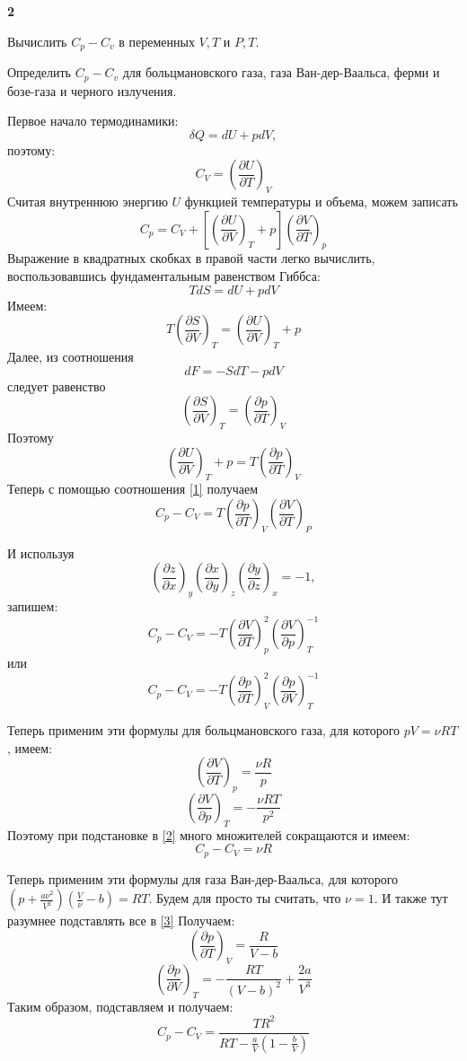 \documentclass[a4paper,12pt]{article} %
\begin{document}
\begin{task}\textbf{2}

Вычислить $ C_p-C_v$ в  переменных $ V, T $ и $ P, T$. 

Определить $ C_p-C_v$ для больцмановского газа,
газа Ван-дер-Ваальса, ферми и бозе-газа и черного излучения.

Первое начало термодинамики:
$$
\delta Q=d U+p d V,
$$
поэтому:
$$
C_{V}=\left(\frac{\partial U}{\partial T}\right)_{V}
$$
Считая внутреннюю энергию $U$ функцией температуры и объема, можем записать
\begin{equation}\label{1}
C_{p}=C_{V}+\left[\left(\frac{\partial U}{\partial V}\right)_{T}+p\right]\left(\frac{\partial V}{\partial T}\right)_{p}
\end{equation}
Выражение в квадратных скобках в правой части легко вычислить, воспользовавшись фундаментальным равенством Гиббса:
$$
T d S=d U+p d V
$$
Имеем:
$$
T\left(\frac{\partial S}{\partial V}\right)_{T}=\left(\frac{\partial U}{\partial V}\right)_{T}+p
$$
Далее, из соотношения
$$
d F=-S d T-p d V
$$
следует равенство
$$
\left(\frac{\partial S}{\partial V}\right)_{T}=\left(\frac{\partial p}{\partial T}\right)_{V}
$$
Поэтому
$$
\left(\frac{\partial U}{\partial V}\right)_{T}+p=T\left(\frac{\partial p}{\partial T}\right)_{V}
$$
Теперь с помощью соотношения \ref{1} получаем
$$
C_{p}-C_{V}=T\left(\frac{\partial p}{\partial T}\right)_{V}\left(\frac{\partial V}{\partial T}\right)_{P}
$$

И используя 
\[ \left(\frac{\partial z}{\partial x}\right)_{y}\left(\frac{\partial x}{\partial y}\right)_{z}\left(\frac{\partial y}{\partial z}\right)_{x}=-1, \]
запишем:
\begin{equation}\label{2}
C_{p}-C_{V}=
-T\left(\frac{\partial V}{\partial T}\right)_{p}^{2}\left(\frac{\partial V}{\partial p}\right)_{T}^{-1}
\end{equation}
или
\begin{equation}\label{3}
C_{p}-C_{V}=
-T\left(\frac{\partial p}{\partial T}\right)_{V}^{2}\left(\frac{\partial p}{\partial V}\right)_{T}^{-1}
\end{equation}


Теперь применим эти формулы для больцмановского газа, для которого $ pV=\nu RT $, имеем:
\[ \left(\frac{\partial V}{\partial T}\right)_{p}=\frac{\nu R}{p} \]
\[\left(\frac{\partial V}{\partial p}\right)_{T} =-\frac{\nu RT}{p^2} \]
Поэтому при подстановке в \ref{2} много множителей сокращаются и имеем:
\[ C_p-C_V=\nu R \]

Теперь применим эти формулы для газа Ван-дер-Ваальса, для которого $ \left(p+\frac{a\nu^2}{V^{2}}\right)\left(\frac{V}{\nu}-b\right)=R T$. 
Будем для просто ты считать, что $\nu=1$. 
И также тут разумнее подставлять все в \ref{3}
Получаем:
\[ \left(\frac{\partial p}{\partial T}\right)_{V}=\frac{R}{V-b} \]
\[ \left(\frac{\partial p}{\partial V}\right)_{T}=-\frac{RT}{(V-b)^2}+\frac{2a}{V^3} \]
Таким образом, подставляем и получаем:
\[ C_p-C_V=\frac{TR^2}{RT-\frac{a}{V}\left(1-\frac{b}{V}\right)} \]



\end{task}
\end{document}
